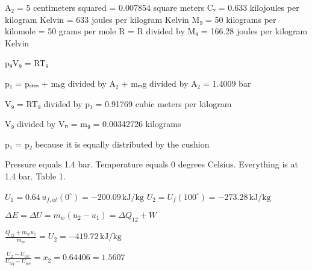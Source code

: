 A₂ = 5 centimeters squared = 0.007854 square meters  
Cᵥ = 0.633 kilojoules per kilogram Kelvin = 633 joules per kilogram Kelvin  
M₉ = 50 kilograms per kilomole = 50 grams per mole  
R = R divided by M₉ = 166.28 joules per kilogram Kelvin  

p₉V₉ = RT₉  

p₁ = pₐₜₘ + mₖg divided by A₂ + mₑₓg divided by A₂ = 1.4009 bar  

V₉ = RT₉ divided by p₁ = 0.91769 cubic meters per kilogram  

V₉ divided by Vₙ = m₉ = 0.00342726 kilograms  

p₁ = p₂ because it is equally distributed by the cushion

Pressure equals 1.4 bar.  
Temperature equals 0 degrees Celsius. Everything is at 1.4 bar. Table 1.  

\( U_1 = 0.64 \, u_{f,at}(0^\circ) = -200.09 \, \text{kJ/kg} \)  
\( U_2 = U_{f}(100^\circ) = -273.28 \, \text{kJ/kg} \)  

\( \Delta E = \Delta U = m_w (u_2 - u_1) = \Delta Q_{12} + W \)  

\( \frac{Q_{12} + m_w u_1}{m_w} = U_2 = -419.72 \, \text{kJ/kg} \)  

\( \frac{U_2 - U_{ice}}{U_{liq} - U_{ice}} = x_2 = 0.64406 = 1.5607 \)